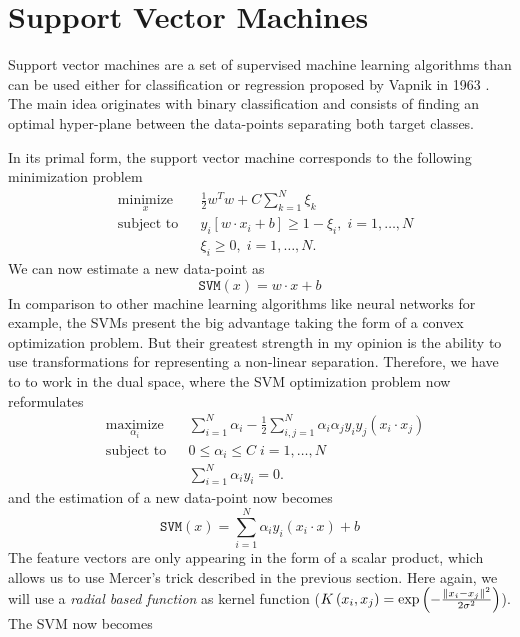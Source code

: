 \section{Support Vector Machines}
Support vector machines are a set of supervised machine learning algorithms than can be used either for classification or regression proposed by Vapnik in 1963 \cite{VapLer63}. The main idea originates with binary classification and consists of finding an optimal hyper-plane between the data-points separating both target classes.

In its primal form, the support vector machine corresponds to the following minimization problem
\begin{equation}
    \begin{aligned}
& \underset{x}{\text{minimize}} 
& & \frac{1}{2}w^Tw + C \sum_{k=1}^N \xi_k \\
& \text{subject to}
& & y_i\left[ w \cdot x_i+b \right] \geq 1-\xi_i, \; i = 1, \ldots, N \\
& 
& & \xi_i \geq 0, \; i = 1, \ldots, N.
\end{aligned}
\end{equation}
We can now estimate a new data-point as
\begin{equation}
    \mathtt{SVM}(x) = w \cdot x + b 
\end{equation}
In comparison to other machine learning algorithms like neural networks for example, the SVMs present the big advantage taking the form of a convex optimization problem. But their greatest strength in my opinion is the ability to use transformations for representing a non-linear separation. Therefore, we have to to work in the dual space, where the SVM optimization problem now reformulates
\begin{equation}
    \begin{aligned}
& \underset{\alpha_i}{\text{maximize}} 
& & \sum_{i=1}^N \alpha_i - \frac12 \sum_{i,j=1}^N \alpha_i \alpha_j y_i y_j (x_i \cdot x_j) \\
& \text{subject to}
& & 0 \leq \alpha_i \leq C \; i = 1, \ldots, N \\
& 
& & \sum_{i=1}^N\alpha_i y_i = 0.
\end{aligned}
\end{equation}
and the estimation of a new data-point now becomes
\begin{equation}
    \mathtt{SVM}(x) = \sum_{i=1}^N \alpha_i y_i (x_i \cdot x) + b
\end{equation}
The feature vectors are only appearing in the form of a scalar product, which allows us to use Mercer's trick described in the previous section. Here again, we will use a \emph{radial based function} as kernel function ($K\left( x_i,x_j\right) = \exp\left(-\frac{\left\lVert x_i - x_j\right\rVert^2}{2\sigma^2}\right)$). The SVM now becomes
